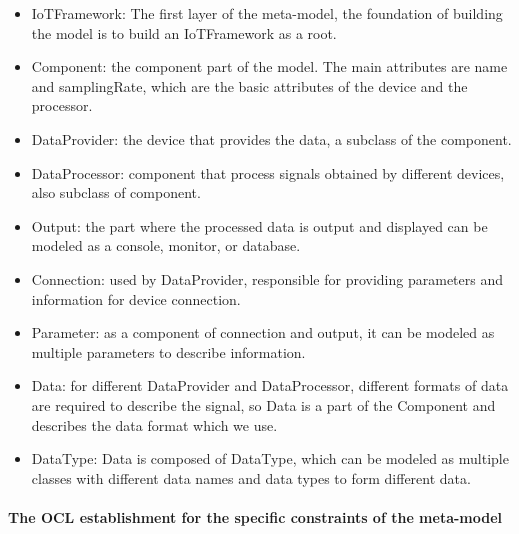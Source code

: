 \documentclass{article}
\begin{document}
\begin{itemize}
  \item IoTFramework: The first layer of the meta-model, the foundation of building the model is to build an IoTFramework as a root.
  \item Component:  the component part of the model. The main attributes are name and samplingRate, which are the basic attributes of the device and the processor.
  \item DataProvider: the device that provides the data, a subclass of the component.
  \item DataProcessor: component that process signals obtained by different devices, also subclass of component.
  \item Output: the part where the processed data is output and displayed can be modeled as a console, monitor, or database.
  \item Connection: used by DataProvider, responsible for providing parameters and information for device connection.
  \item Parameter: as a component of connection and output, it can be modeled as multiple parameters to describe information.
  \item Data: for different DataProvider and DataProcessor, different formats of data are required to describe the signal, so Data is a part of the Component and describes the data format which we use.
  \item DataType: Data is composed of DataType, which can be modeled as multiple classes with different data names and data types to form different data.
\end{itemize}

\paragraph{The OCL establishment for the specific constraints of the meta-model} 

\paragraph{}
\end{document}
